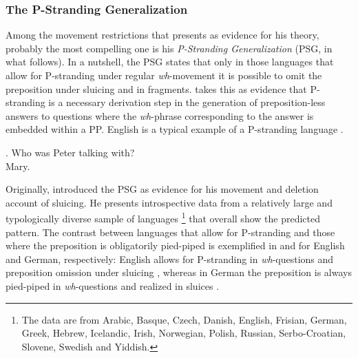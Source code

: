 \subsubsection{The P-Stranding Generalization}\label{sec:pstranding-background-psg}
Among the movement restrictions that \citet{merchant2004} presents as evidence for his theory, probably the most compelling one is his \textit{P-Stranding Generalization} (PSG, in what follows). In a nutshell, the PSG states that only in those languages that allow for P-stranding under regular \textit{wh}-movement it is possible to omit the preposition under sluicing and in fragments. \citeauthor{merchant2004} takes this as evidence that P-stranding is a necessary derivation step in the generation of preposition-less answers to questions where the \textit{wh}-phrase corresponding to the answer is embedded within a PP. English is a typical example of a P-stranding language \Next. 

\ex. Who was Peter talking with?\hfill\citep[685]{merchant2004}\\
Mary.

Originally, \citet{merchant2001} introduced the PSG as evidence for his movement and deletion account of sluicing. He presents introspective data from a relatively large and typologically diverse sample of languages%
%
\footnote{The data are from Arabic, Basque, Czech, Danish, English, Frisian, German, Greek, Hebrew, Icelandic, Irish, Norwegian, Polish, Russian,  Serbo-Croatian, Slovene, Swedish and Yiddish.}\afterfn%
%
that overall show the predicted pattern. The contrast between languages that allow for P-stranding and those where the preposition is obligatorily pied-piped is exemplified in \Next and \NNext for English and German, respectively: English allows for P-stranding in \textit{wh}-questions \Next[a] and preposition omission under sluicing \Next[b], whereas in German the preposition is always pied-piped in \textit{wh}-questions \NNext[a] and realized in sluices \NNext[b].

